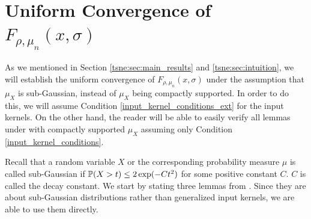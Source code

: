 \section{Uniform Convergence of \texorpdfstring{$F_{\rho, \mu_n}(x,\sigma)$}{F}}\label{tsne:sec:uniform_convergence}
As we mentioned in Section \ref{tsne:sec:main_results} and \ref{tsne:sec:intuition}, we will establish the uniform convergence of $F_{\rho,\mu_n}(x,\sigma)$ under the assumption that $\mu_X$ is sub-Gaussian, instead of $\mu_X$ being compactly supported. In order to do this, we will assume Condition \ref{input_kernel_conditions_ext} for the input kernels. On the other hand, the reader will be able to easily verify all lemmas under with compactly supported $\mu_X$ assuming only Condition \ref{input_kernel_conditions}.

Recall that a random variable $X$ or the corresponding probability measure
$\mu$ is called sub-Gaussian if $\mathbb{P}(X>t) \leq 2 \exp(-Ct^2)$ for some positive
constant $C$. $C$ is called the decay constant. We start by stating three
lemmas from \cite{auffinger-tsne}. Since they are about sub-Gaussian
distributions rather than generalized input kernels, we are able to use them
directly.

